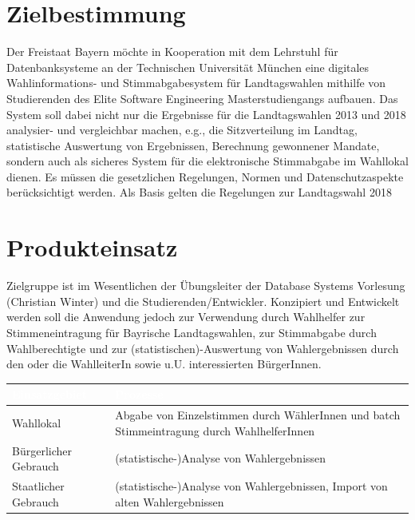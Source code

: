 \documentclass[a4paper,12pt]{article}
\begin{document}
 \setcounter{page}{2}
 \tableofcontents          %
 \clearpage
 
\section{Zielbestimmung}
Der Freistaat Bayern möchte in Kooperation mit dem Lehrstuhl für 
Datenbanksysteme an der Technischen Universität München eine digitales 
Wahlinformations- und Stimmabgabesystem für Landtagswahlen mithilfe von 
Studierenden des Elite Software Engineering Masterstudiengangs aufbauen.
%
Das System soll dabei nicht nur die Ergebnisse für die Landtagswahlen 
2013 und 2018 analysier- und vergleichbar machen, e.g., die Sitzverteilung 
im Landtag, statistische Auswertung von Ergebnissen, Berechnung gewonnener
Mandate, sondern auch als sicheres System für die elektronische 
Stimmabgabe im Wahllokal dienen. 
%
Es müssen die gesetzlichen Regelungen, Normen und Datenschutzaspekte
berücksichtigt werden. Als Basis gelten die Regelungen zur
Landtagswahl 2018

\section{Produkteinsatz}
Zielgruppe ist im Wesentlichen der Übungsleiter der Database Systems 
Vorlesung (Christian Winter) und die Studierenden/Entwickler. 
%
Konzipiert und Entwickelt werden soll die Anwendung jedoch zur Verwendung 
durch Wahlhelfer zur Stimmeneintragung für Bayrische Landtagswahlen, 
zur Stimmabgabe durch Wahlberechtigte und zur (statistischen)-Auswertung
von Wahlergebnissen durch den oder die WahlleiterIn sowie u.U. 
interessierten BürgerInnen.

\begin{center}
\begin{tabular}{|m{5cm}|m{10cm}|}
	\hline
  \rowcolor{TUMBlue} \textcolor{white}{\textbf{Einsatzgebiet}} & \textcolor{white}{\textbf{Prozesse}} \\
  \hline
  Wahllokal & Abgabe von Einzelstimmen durch WählerInnen und batch Stimmeintragung durch WahlhelferInnen \\
	\hline
  Bürgerlicher Gebrauch & (statistische-)Analyse von Wahlergebnissen \\
  \hline
  Staatlicher Gebrauch & (statistische-)Analyse von Wahlergebnissen, Import von alten Wahlergebnissen \\
	\hline
\end{tabular}
\end{center}
\end{document}
